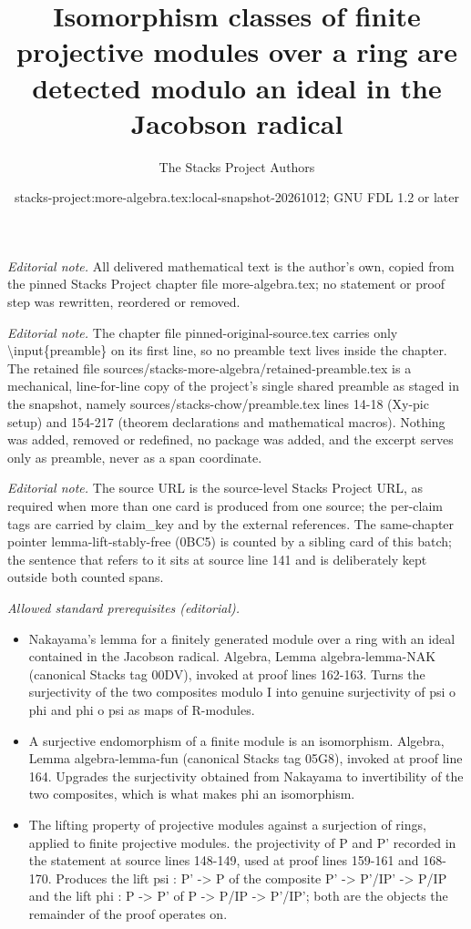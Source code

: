 \documentclass[10pt,a4paper]{amsart}
\title{Isomorphism classes of finite projective modules over a ring are detected modulo an ideal in the Jacobson radical}
\author{The Stacks Project Authors}
\date{stacks-project:more-algebra.tex:local-snapshot-20261012; GNU FDL 1.2 or later}
\theoremstyle{plain}
\theoremstyle{definition}
\theoremstyle{remark}
\numberwithin{equation}{subsection}
\begin{document}
\maketitle
\setcounter{subsection}{1}
\noindent\textit{Editorial note.} All delivered mathematical text is the author's own, copied from the pinned Stacks Project chapter file more-algebra.tex; no statement or proof step was rewritten, reordered or removed.\par\medskip
\noindent\textit{Editorial note.} The chapter file pinned-original-source.tex carries only \textbackslash{}input\{preamble\} on its first line, so no preamble text lives inside the chapter. The retained file sources/stacks-more-algebra/retained-preamble.tex is a mechanical, line-for-line copy of the project's single shared preamble as staged in the snapshot, namely sources/stacks-chow/preamble.tex lines 14-18 (Xy-pic setup) and 154-217 (theorem declarations and mathematical macros). Nothing was added, removed or redefined, no package was added, and the excerpt serves only as preamble, never as a span coordinate.\par\medskip
\noindent\textit{Editorial note.} The source URL is the source-level Stacks Project URL, as required when more than one card is produced from one source; the per-claim tags are carried by claim\_key and by the external references. The same-chapter pointer lemma-lift-stably-free (0BC5) is counted by a sibling card of this batch; the sentence that refers to it sits at source line 141 and is deliberately kept outside both counted spans.\par\medskip
\noindent\textit{Allowed standard prerequisites (editorial).}\begin{itemize}
\item Nakayama's lemma for a finitely generated module over a ring with an ideal contained in the Jacobson radical. Algebra, Lemma algebra-lemma-NAK (canonical Stacks tag 00DV), invoked at proof lines 162-163. Turns the surjectivity of the two composites modulo I into genuine surjectivity of psi o phi and phi o psi as maps of R-modules.
\item A surjective endomorphism of a finite module is an isomorphism. Algebra, Lemma algebra-lemma-fun (canonical Stacks tag 05G8), invoked at proof line 164. Upgrades the surjectivity obtained from Nakayama to invertibility of the two composites, which is what makes phi an isomorphism.
\item The lifting property of projective modules against a surjection of rings, applied to finite projective modules. the projectivity of P and P' recorded in the statement at source lines 148-149, used at proof lines 159-161 and 168-170. Produces the lift psi : P' -> P of the composite P' -> P'/IP' -> P/IP and the lift phi : P -> P' of P -> P/IP -> P'/IP'; both are the objects the remainder of the proof operates on.
\end{itemize}\medskip
\end{document}

